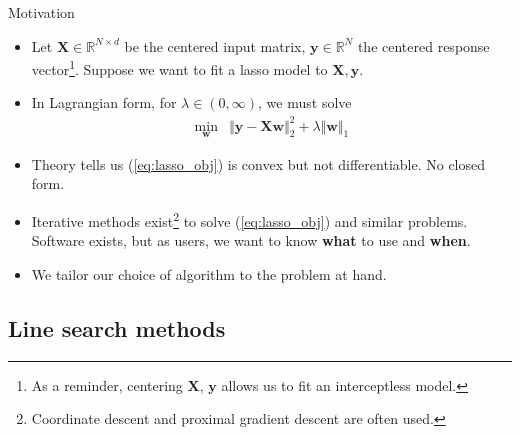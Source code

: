\documentclass{beamer}
\numberwithin{equation}{section}
\newcommand{\aref}[1]{\alert{\ref{#1}}}
\begin{document}
\begin{frame}{Motivation}
    \begin{itemize}
        \item
        Let $ \mathbf{X} \in \mathbb{R}^{N \times d} $ be the centered input
        matrix, $ \mathbf{y} \in \mathbb{R}^N $ the centered response
        vector\footnote{
            As a reminder, centering $ \mathbf{X} $, $ \mathbf{y} $ allows us
            to fit an interceptless model.
        }.
        Suppose we want to fit a lasso model to $ \mathbf{X}, \mathbf{y} $.

        \item
        In Lagrangian form, for $ \lambda \in (0, \infty) $, we must solve
        \begin{equation} \label{eq:lasso_obj}
            \begin{array}{ll}
                \displaystyle\min_\mathbf{w} &
                \Vert\mathbf{y} - \mathbf{Xw}\Vert_2^2 +
                \lambda\Vert\mathbf{w}\Vert_1
            \end{array}
        \end{equation}

        \item
        Theory tells us (\aref{eq:lasso_obj}) is convex but not
        differentiable. No closed form.

        \item
        Iterative methods exist\footnote{
            Coordinate descent and proximal gradient descent are often used.
        } to solve (\aref{eq:lasso_obj}) and similar
        problems. Software exists, but as users, we want to know \textbf{what}
        to use and \textbf{when}.

        \item
        \alert{We tailor our choice of algorithm to the problem at hand.}
    \end{itemize}
\end{frame}

\subsection{Line search methods}
\end{document}
